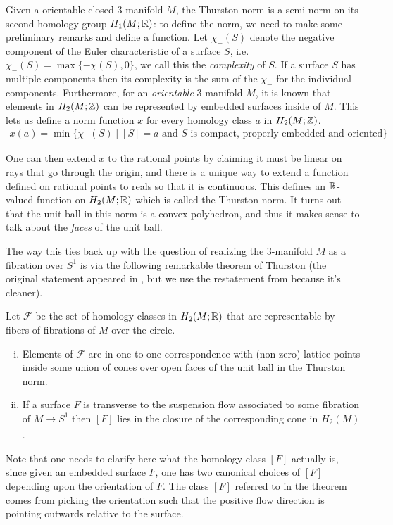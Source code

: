 Given a orientable closed $3$-manifold $M$, the Thurston norm is a semi-norm on its second homology
group $H_1(M; \mathbb{R})$: to define the norm, we need to make some preliminary remarks and define a
function.  Let $\chi_-(S)$ denote the negative component of the Euler characteristic of a surface
$S$, i.e. $\chi_-(S) = \max\{-\chi(S),0\}$, we call this the \textit{complexity} of $S$. If a
surface $S$ has multiple components then its complexity is the sum of the $\chi_-$ for the
individual components.  Furthermore, for an \emph{orientable} 3-manifold $M$, it is known that
elements in $H_2(M ; \mathbb{Z})$ can be represented by embedded surfaces inside of $M$. This lets us
define a norm function $x$ for every homology class $a$ in $H_2(M; \mathbb{Z})$.
\begin{align*}
  x(a) = \min\{\chi_-(S) \mid [S] = a \text{ and $S$ is compact, properly embedded and oriented}\}
\end{align*}

One can then extend $x$ to the rational points by claiming it must be linear on rays that go through
the origin, and there is a unique way to extend a function defined on rational points to reals so
that it is continuous. This defines an $\mathbb{R}$-valued function on $H_2(M; \mathbb{R})$ which is called the
Thurston norm. It turns out that the unit ball in this norm is a convex polyhedron, and thus it makes
sense to talk about the \emph{faces} of the unit ball.

The way this ties back up with the question of realizing the $3$-manifold $M$ as a fibration over
$S^1$ is via the following remarkable theorem of Thurston (the original statement appeared in
\cite{thurston1986norm}, but we use the restatement from \cite{yazdi2018pseudo} because it's
cleaner).

\begin{thm}[Thurston]
  \label{thm:Thur1}
  Let $\mathcal{F}$ be the set of homology classes in $H_2(M; \mathbb{R})$ that are representable by fibers of
  fibrations of $M$ over the circle.
\begin{enumerate}[(i)]
\item Elements of $\mathcal{F}$ are in one-to-one correspondence with (non-zero) lattice points
  inside some union of cones over open faces of the unit ball in the Thurston norm.
\item If a surface $F$ is transverse to the suspension flow associated to some fibration of
  $M \xrightarrow[]{} S^1$ then $[F]$ lies in the closure of the corresponding cone in $H_2(M)$.
\end{enumerate}
\end{thm}
Note that one needs to clarify here what the homology class $[F]$ actually is, since given an
embedded surface $F$, one has two canonical choices of $[F]$ depending upon the orientation
of $F$. The class $[F]$ referred to in the theorem comes from picking the orientation such
that the positive flow direction is pointing outwards relative to the surface.

